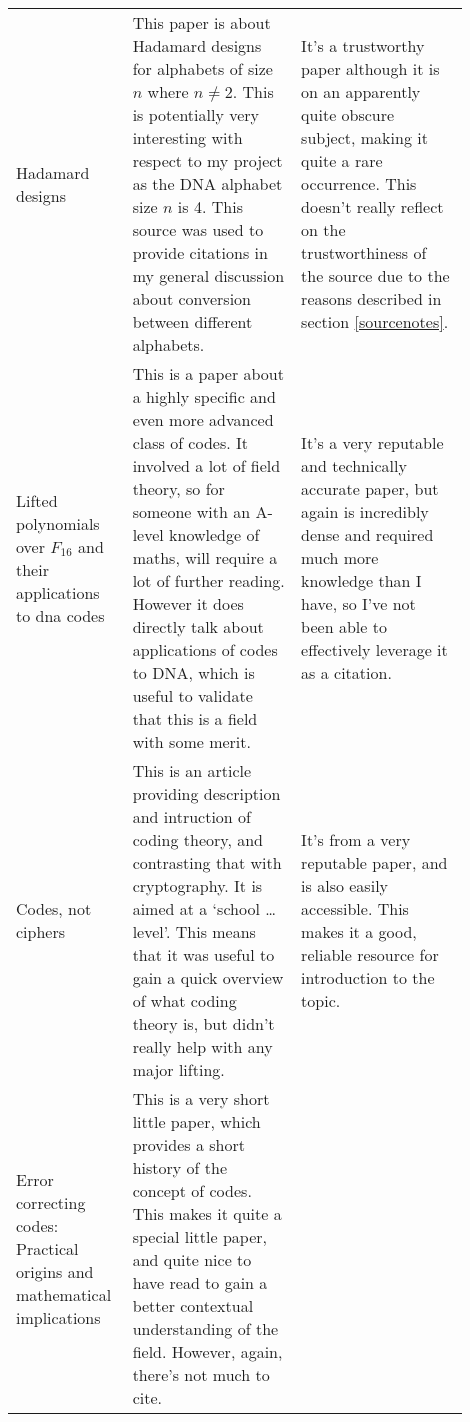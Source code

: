 \documentclass[a4paper,11pt]{article}
\begin{document}
\begin{center}
{\begin{longtable}{p{0.2\linewidth} p{0.35\linewidth} p{0.35\linewidth}}
    Hadamard designs \cite{HadamardDesigns1972Spence} &

    This paper is about Hadamard designs for alphabets of size $n$ where $n
    \neq 2$. This is potentially very interesting with respect to my project as
    the DNA alphabet size $n$ is 4. This source was used to provide citations in my
    general discussion about conversion between different alphabets. &

    It's a trustworthy paper although it is on an apparently quite obscure
    subject, making it quite a rare occurrence. This doesn't really reflect on
    the trustworthiness of the source due to the reasons described in section
    \ref{sourcenotes}.  \\

    Lifted polynomials over ${F}_{16}$ and their applications to dna codes \cite{PolynomialDNA2013OztasSiap} &

    This is a paper about a highly specific and even more advanced class of
    codes. It involved a lot of field theory, so for someone with an A-level
    knowledge of maths, will require a lot of further reading. However it does
    directly talk about applications of codes to DNA, which is useful to
    validate that this is a field with some merit. &

    It's a very reputable and technically accurate paper, but again is
    incredibly dense and required much more knowledge than I have, so I've not
    been able to effectively leverage it as a citation.

    \\

    Codes, not ciphers \cite{CodesCiphers1010Baylis} &

    This is an article providing description and intruction of coding theory,
    and contrasting that with cryptography. It is aimed at a `school \ldots
    level'. This means that it was useful to gain a quick overview of what
    coding theory is, but didn't really help with any major lifting. &

    It's from a very reputable paper, and is also easily accessible. This makes
    it a good, reliable resource for introduction to the topic.

    \\

    Error correcting codes: Practical origins and mathematical implications \cite{CodesOrigins1978Pless} &

    This is a very short little paper, which provides a short history of the
    concept of codes. This makes it quite a special little paper, and quite nice
    to have read to gain a better contextual understanding of the field.
    However, again, there's not much to cite. &


\end{longtable}}
\end{center}
\end{document}
